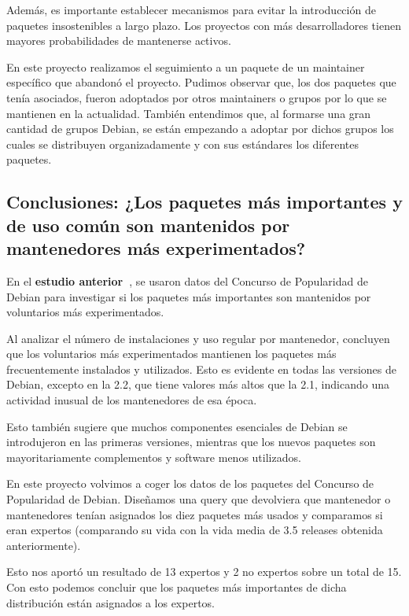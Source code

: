 \documentclass[a4paper, 12pt]{book}
\begin{document}
Además, es importante establecer mecanismos para evitar la introducción de paquetes insostenibles a largo plazo. Los proyectos con más desarrolladores tienen mayores probabilidades de mantenerse activos.

En este proyecto realizamos el seguimiento a un paquete de un maintainer específico que abandonó el proyecto. Pudimos observar que, los dos paquetes que tenía asociados, fueron adoptados por otros maintainers o grupos por lo que se mantienen en la actualidad. También entendimos que, al formarse una gran cantidad de grupos Debian, se están empezando a adoptar por dichos grupos los cuales se distribuyen organizadamente y con sus estándares los diferentes paquetes.

\subsection{Conclusiones: ¿Los paquetes más importantes y de uso común son mantenidos por mantenedores más experimentados?}
\label{subsec:conclusion_6}

En el \textbf{estudio anterior~\cite{robles05:_debian}}, se usaron datos del Concurso de Popularidad de Debian para investigar si los paquetes más importantes son mantenidos por voluntarios más experimentados.

Al analizar el número de instalaciones y uso regular por mantenedor, concluyen que los voluntarios más experimentados mantienen los paquetes más frecuentemente instalados y utilizados. Esto es evidente en todas las versiones de Debian, excepto en la 2.2, que tiene valores más altos que la 2.1, indicando una actividad inusual de los mantenedores de esa época.

Esto también sugiere que muchos componentes esenciales de Debian se introdujeron en las primeras versiones, mientras que los nuevos paquetes son mayoritariamente complementos y software menos utilizados.

En este proyecto volvimos a coger los datos de los paquetes del Concurso de Popularidad de Debian. Diseñamos una query que devolviera que mantenedor o mantenedores tenían asignados los diez paquetes más usados y comparamos si eran expertos (comparando su vida con la vida media de 3.5 releases obtenida anteriormente).

Esto nos aportó un resultado de 13 expertos y 2 no expertos sobre un total de 15. Con esto podemos concluir que los paquetes más importantes de dicha distribución están asignados a los expertos.
\end{document}
